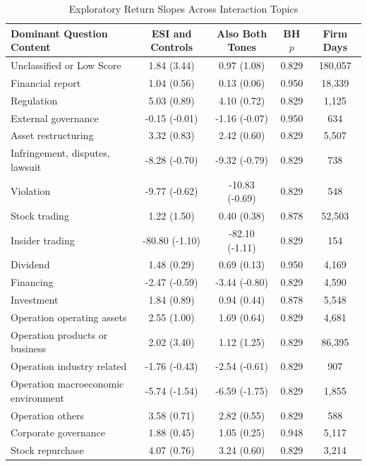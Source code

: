 \begin{table}[H]
\centering
\caption{Exploratory Return Slopes Across Interaction Topics}
\label{tab:full_topic_heterogeneity}
\footnotesize
\renewcommand{\arraystretch}{1.03}
\setlength{\tabcolsep}{3pt}
\begin{threeparttable}
\begin{tabular*}{\textwidth}{@{\extracolsep{\fill}}l c c c c @{}}
\toprule
Dominant Question Content & ESI and Controls & Also Both Tones & BH $p$ & Firm Days \\
\midrule
Unclassified or Low Score & 1.84 (3.44) & 0.97 (1.08) & 0.829 & 180,057 \\
Financial report & 1.04 (0.56) & 0.13 (0.06) & 0.950 & 18,339 \\
Regulation & 5.03 (0.89) & 4.10 (0.72) & 0.829 & 1,125 \\
External governance & -0.15 (-0.01) & -1.16 (-0.07) & 0.950 & 634 \\
Asset restructuring & 3.32 (0.83) & 2.42 (0.60) & 0.829 & 5,507 \\
Infringement, disputes, lawsuit & -8.28 (-0.70) & -9.32 (-0.79) & 0.829 & 738 \\
Violation & -9.77 (-0.62) & -10.83 (-0.69) & 0.829 & 548 \\
Stock trading & 1.22 (1.50) & 0.40 (0.38) & 0.878 & 52,503 \\
Insider trading & -80.80 (-1.10) & -82.10 (-1.11) & 0.829 & 154 \\
Dividend & 1.48 (0.29) & 0.69 (0.13) & 0.950 & 4,169 \\
Financing & -2.47 (-0.59) & -3.44 (-0.80) & 0.829 & 4,590 \\
Investment & 1.84 (0.89) & 0.94 (0.44) & 0.878 & 5,548 \\
Operation operating assets & 2.55 (1.00) & 1.69 (0.64) & 0.829 & 4,681 \\
Operation products or business & 2.02 (3.40) & 1.12 (1.25) & 0.829 & 86,395 \\
Operation industry related & -1.76 (-0.43) & -2.54 (-0.61) & 0.829 & 907 \\
Operation macroeconomic environment & -5.74 (-1.54) & -6.59 (-1.75) & 0.829 & 1,855 \\
Operation others & 3.58 (0.71) & 2.82 (0.55) & 0.829 & 588 \\
Corporate governance & 1.88 (0.45) & 1.05 (0.25) & 0.948 & 5,117 \\
Stock repurchase & 4.07 (0.76) & 3.24 (0.60) & 0.829 & 3,214 \\

\end{tabular*}
\end{threeparttable}
\end{table}
